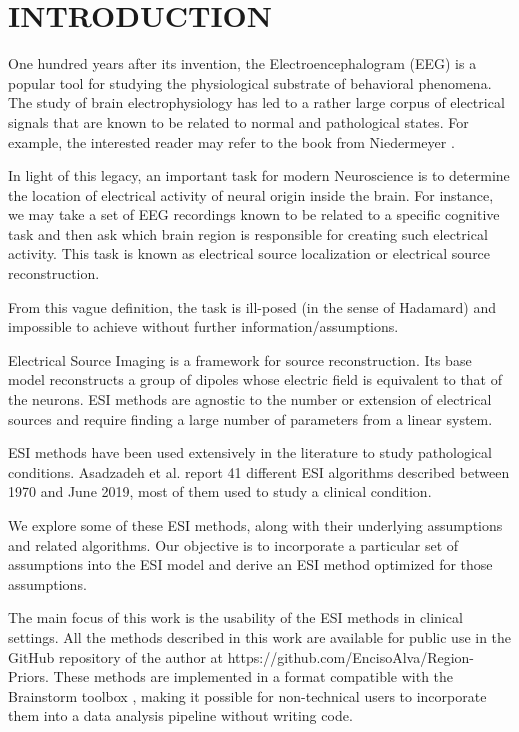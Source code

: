 \chapter{INTRODUCTION}
\label{ch:intro}

One hundred years after its invention, the Electroencephalogram (EEG) is a popular tool for studying the physiological substrate of behavioral phenomena.
%
The study of brain electrophysiology has led to a rather large corpus of electrical signals that are known to be related to normal and pathological states.
%
For example, the interested reader may refer to the book from Niedermeyer \cite{niedermeyer2011niedermeyer}.

In light of this legacy, an important task for modern Neuroscience is to determine the location of electrical activity of neural origin inside the brain. 
%
For instance, we may take a set of EEG recordings known to be related to a specific cognitive task and then ask which brain region is responsible for creating such electrical activity.
%
This task is known as electrical source localization or electrical source reconstruction.

From this vague definition, the task is ill-posed (in the sense of Hadamard) and impossible to achieve without further information/assumptions.

Electrical Source Imaging is a framework for source reconstruction. Its base model reconstructs a group of dipoles whose electric field is equivalent to that of the neurons.
%
ESI methods are agnostic to the number or extension of electrical sources and require finding a large number of parameters from a linear system.

ESI methods have been used extensively in the literature to study pathological conditions.
%
Asadzadeh et al. report 41 different ESI algorithms described between 1970 and June 2019, most of them used to study a clinical condition.

We explore some of these ESI methods, along with their underlying assumptions and related algorithms.
%
Our objective is to incorporate a particular set of assumptions into the ESI model and derive an ESI method optimized for those assumptions.

The main focus of this work is the usability of the ESI methods in clinical settings.
%
All the methods described in this work are available for public use in the GitHub repository of the author at 
https://github.com/EncisoAlva/Region-Priors.
%
These methods are implemented in a format compatible with the Brainstorm toolbox \cite{brainstorm}, making it possible for non-technical users to incorporate them into a data analysis pipeline without writing code.

